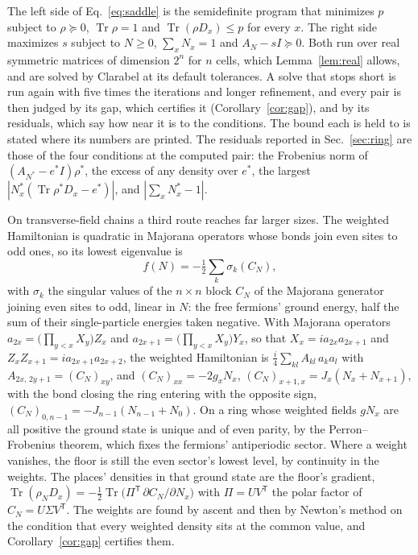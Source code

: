 \documentclass[aps,prd,reprint,superscriptaddress]{revtex4-2}
\begin{document}
The left side of Eq.~\eqref{eq:saddle} is the semidefinite program that minimizes $p$ subject to $\rho \succeq 0$, $\operatorname{Tr}\rho = 1$ and $\operatorname{Tr}(\rho D_x) \le p$ for every $x$. The right side maximizes $s$ subject to $N \ge 0$, $\sum_x N_x = 1$ and $A_N - sI \succeq 0$. Both run over real symmetric matrices of dimension $2^n$ for $n$ cells, which Lemma~\ref{lem:real} allows, and are solved by Clarabel at its default tolerances. A solve that stops short is run again with five times the iterations and longer refinement, and every pair is then judged by its gap, which certifies it (Corollary~\ref{cor:gap}), and by its residuals, which say how near it is to the conditions. The bound each is held to is stated where its numbers are printed. The residuals reported in Sec.~\ref{sec:ring} are those of the four conditions at the computed pair: the Frobenius norm of $(A_{N^*} - e^*I)\rho^*$, the excess of any density over $e^*$, the largest $|N^*_x(\operatorname{Tr}\rho^*D_x - e^*)|$, and $|\sum_x N^*_x - 1|$. 

On transverse-field chains a third route reaches far larger sizes. The weighted Hamiltonian is quadratic in Majorana operators whose bonds join even sites to odd ones, so its lowest eigenvalue is
\begin{equation}
  f(N) = -\tfrac12 \sum_k \sigma_k(C_N),
  \label{eq:freefloor}
\end{equation}
with $\sigma_k$ the singular values of the $n \times n$ block $C_N$ of the Majorana generator joining even sites to odd, linear in $N$: the free fermions' ground energy, half the sum of their single-particle energies taken negative. With Majorana operators $a_{2x} = \big(\prod_{y<x} X_y\big) Z_x$ and $a_{2x+1} = \big(\prod_{y<x} X_y\big) Y_x$, so that $X_x = i a_{2x} a_{2x+1}$ and $Z_x Z_{x+1} = i a_{2x+1} a_{2x+2}$, the weighted Hamiltonian is $\tfrac{i}{4}\sum_{kl} A_{kl}\, a_k a_l$ with $A_{2x,\,2y+1} = (C_N)_{xy}$, and $(C_N)_{xx} = -2 g_x N_x$, $(C_N)_{x+1,x} = J_x (N_x + N_{x+1})$, with the bond closing the ring entering with the opposite sign, $(C_N)_{0,n-1} = -J_{n-1}(N_{n-1} + N_0)$. On a ring whose weighted fields $gN_x$ are all positive the ground state is unique and of even parity, by the Perron--Frobenius theorem, which fixes the fermions' antiperiodic sector. Where a weight vanishes, the floor is still the even sector's lowest level, by continuity in the weights. The places' densities in that ground state are the floor's gradient, $\operatorname{Tr}(\rho_N D_x) = -\tfrac12 \operatorname{Tr}\big(\Pi^{\mathsf T}\, \partial C_N/\partial N_x\big)$ with $\Pi = UV^{\mathsf T}$ the polar factor of $C_N = U\Sigma V^{\mathsf T}$. The weights are found by ascent and then by Newton's method on the condition that every weighted density sits at the common value, and Corollary~\ref{cor:gap} certifies them.
\end{document}
